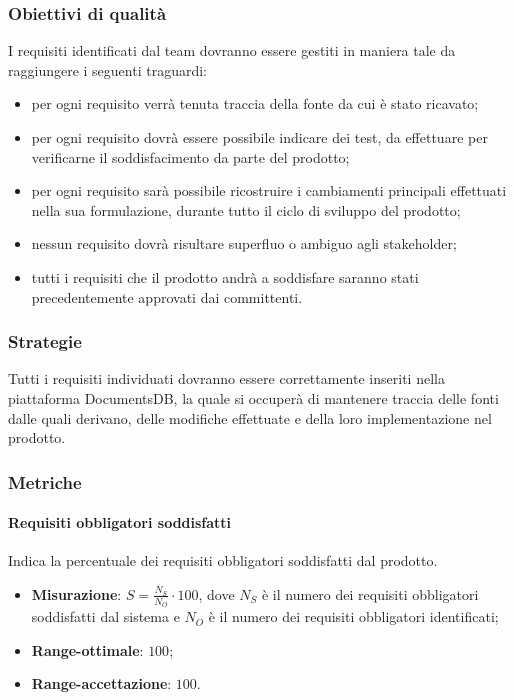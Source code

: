 \subsubsection{Obiettivi di qualità}
I requisiti identificati dal team dovranno essere gestiti in maniera tale da raggiungere i seguenti traguardi:
\begin{itemize}
\item per ogni requisito verrà tenuta traccia della fonte da cui è stato ricavato;
\item per ogni requisito dovrà essere possibile indicare dei test, da effettuare per verificarne il soddisfacimento da parte del prodotto;
\item per ogni requisito sarà possibile ricostruire i cambiamenti principali effettuati nella sua formulazione, durante tutto il ciclo di sviluppo del prodotto;
\item nessun requisito dovrà risultare superfluo o ambiguo agli stakeholder;
\item tutti i requisiti che il prodotto andrà a soddisfare saranno stati precedentemente approvati dai committenti.
\end{itemize}
\subsubsection{Strategie}
Tutti i requisiti individuati dovranno essere correttamente inseriti nella piattaforma DocumentsDB, la quale si occuperà di mantenere traccia delle fonti dalle quali derivano, delle modifiche effettuate e della loro implementazione nel prodotto.
\subsubsection{Metriche}
\paragraph{Requisiti obbligatori soddisfatti}
\label{reqObbSodd}
Indica la percentuale dei requisiti obbligatori soddisfatti dal prodotto.
\begin{itemize}
\item \textbf{Misurazione}: $S=\frac{N_{S}}{N_{O}} \cdot 100$, dove $N_{S}$ è il numero dei requisiti obbligatori soddisfatti dal sistema e $N_{O}$ è il numero dei requisiti obbligatori identificati;
\item \textbf{Range-ottimale}: $100$;
\item \textbf{Range-accettazione}: $100$.
\end{itemize}
